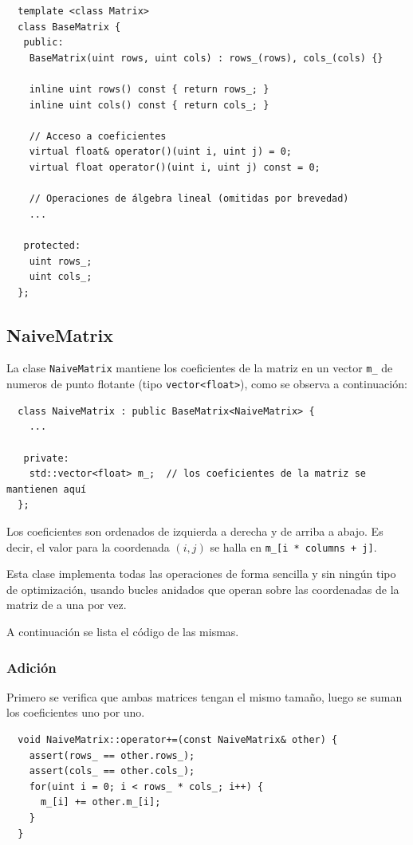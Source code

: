 \documentclass[a4paper, 10pt, twoside]{article}
\newcommand{\cc}[1]{\texttt{#1}}
\begin{document}
\begin{verbatim}
  template <class Matrix>
  class BaseMatrix {
   public:
    BaseMatrix(uint rows, uint cols) : rows_(rows), cols_(cols) {}

    inline uint rows() const { return rows_; }
    inline uint cols() const { return cols_; }

    // Acceso a coeficientes
    virtual float& operator()(uint i, uint j) = 0;
    virtual float operator()(uint i, uint j) const = 0;

    // Operaciones de álgebra lineal (omitidas por brevedad)
    ...

   protected:
    uint rows_;
    uint cols_;
  };
\end{verbatim}


\subsection{NaiveMatrix}

La clase \cc{NaiveMatrix} mantiene los coeficientes de la matriz en un vector
\cc{m\_} de numeros de punto flotante (tipo \cc{vector<float>}), como se observa
a continuación:

\begin{verbatim}
  class NaiveMatrix : public BaseMatrix<NaiveMatrix> {
    ...

   private:
    std::vector<float> m_;  // los coeficientes de la matriz se mantienen aquí
  };
\end{verbatim}

Los coeficientes son ordenados de izquierda a derecha y de arriba a abajo. Es
decir, el valor para la coordenada $(i, j)$ se halla en \cc{m\_[i * columns +
j]}.

Esta clase implementa todas las operaciones de forma sencilla y sin ningún tipo
de optimización, usando bucles anidados que operan sobre las coordenadas de la
matriz de a una por vez.

A continuación se lista el código de las mismas.


\subsubsection{Adición}

Primero se verifica que ambas matrices tengan el mismo tamaño, luego se suman
los coeficientes uno por uno.

\begin{verbatim}
  void NaiveMatrix::operator+=(const NaiveMatrix& other) {
    assert(rows_ == other.rows_);
    assert(cols_ == other.cols_);
    for(uint i = 0; i < rows_ * cols_; i++) {
      m_[i] += other.m_[i];
    }
  }
\end{verbatim}
\end{document}
